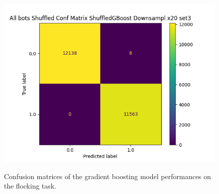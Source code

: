 \documentclass[../../Thesis.tex]{subfiles}
\begin{document}
\begin{figure}
{							\includegraphics[scale=0.31]{../../Images/Experiments/flocking_images/All_bots_Shuffled_Conf_Matrix_ShuffledGBoost_Downsampl_x20_set3.png}
					}
					\caption{Confusion matrices of the gradient boosting model performances on the flocking task.}
					\label{fig:flocking_confusion_matrices}
				\end{figure}
				
\end{document}
